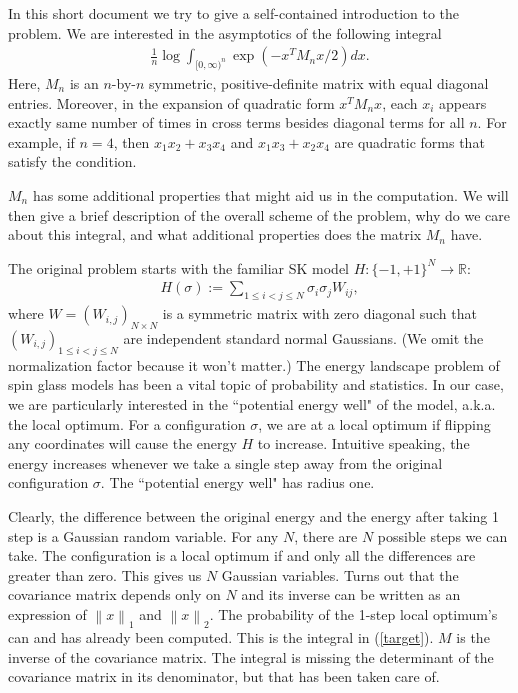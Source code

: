 \documentclass[10pt]{article}
\author{Yi Gu}
\newcommand{\norm}[1]{\left\lVert#1\right\rVert}
\newenvironment{Proof of lemma}{\noindent{\bf Proof of Lemma}}{\hfill$\Box$\newline}
\newenvironment{Proof of claim}{\noindent{\bf Proof of claim}}{\hfill$\Box$\newline}
\newenvironment{Proof of theorem}{\noindent{\bf Proof of Theorem}}{\hfill\scriptsize{$\Box$}\newline}
\newenvironment{Proof of theorems}{\noindent{\bf Proof of Theorems}}{\hfill$\Box$\newline}
\newenvironment{Proof of proposition}{\noindent{\bf Proof of Proposition}}{\hfill$\Box$\newline}
\newenvironment{Proof of propositions}{\noindent{\bf Proof of Propositions}}{\hfill$\Box$\newline}
\newenvironment{Proof of exercise}{\noindent{\it Proof of Exercise:}}{\hfill$\Box$}
\begin{document}
In this short document we try to give a self-contained introduction to the problem. We are interested in the asymptotics of the following integral
\begin{align} \label{target}
    \frac{1}{n}\log \int_{[0,\infty)^n} \exp \left(-x^T M_n x/2\right)dx.
\end{align}
Here, $M_n$ is an $n$-by-$n$ symmetric, positive-definite matrix with equal diagonal entries. Moreover, in the expansion of quadratic form $x^T M_n x$, each $x_i$ appears exactly same number of times in cross terms besides diagonal terms for all $n$. For example, if $n=4$, then $x_1x_2+x_3x_4$ and $x_1x_3+x_2x_4$ are quadratic forms that satisfy the condition.


$M_n$ has some additional properties that might aid us in the computation. We will then give a brief description of the overall scheme of the problem, why do we care about this integral, and what additional properties does the matrix $M_n$ have. 


The original problem starts with the familiar SK model $H:\{-1,+1\}^N \to \mathbb{R}$:
\begin{align}
    H(\sigma) := \sum_{1 \leq i < j \leq N} \sigma_i \sigma_j W_{ij},
\end{align}
where $W = (W_{i,j})_{N\times N}$ is a symmetric matrix with zero diagonal such that $(W_{i,j})_{1 \leq i < j \leq N}$ are independent standard normal Gaussians. (We omit the normalization factor because it won't matter.) The energy landscape problem of spin glass models has been a vital topic of probability and statistics. In our case, we are particularly interested in the ``potential energy well" of the model, a.k.a. the local optimum. For a configuration $\sigma$, we are at a local optimum if flipping any coordinates will cause the energy $H$ to increase. Intuitive speaking, the energy increases whenever we take a single step away from the original configuration $\sigma$. The ``potential energy well" has radius one.

Clearly, the difference between the original energy and the energy after taking 1 step is a Gaussian random variable. For any $N$, there are $N$ possible steps we can take. The configuration is a local optimum if and only all the differences are greater than zero. This gives us $N$ Gaussian variables. Turns out that the covariance matrix depends only on $N$ and its inverse can be written as an expression of $\norm{x}_1$ and $\norm{x}_2$. The probability of the 1-step local optimum's can and has already been computed. This is the integral in (\ref{target}). $M$ is the inverse of the covariance matrix. The integral is missing the determinant of the covariance matrix in its denominator, but that has been taken care of.
\end{document}
